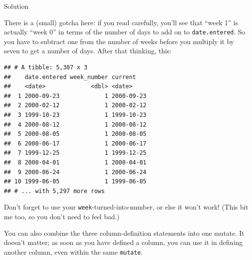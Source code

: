 \documentclass[]{tufte-book}
\newenvironment{Shaded}{}{}
\newcommand{\DataTypeTok}[1]{\textcolor[rgb]{0.56,0.13,0.00}{#1}}
\newcommand{\DecValTok}[1]{\textcolor[rgb]{0.25,0.63,0.44}{#1}}
\newcommand{\KeywordTok}[1]{\textcolor[rgb]{0.00,0.44,0.13}{\textbf{#1}}}
\newcommand{\NormalTok}[1]{#1}
\newcommand{\OperatorTok}[1]{\textcolor[rgb]{0.40,0.40,0.40}{#1}}
\newcommand{\StringTok}[1]{\textcolor[rgb]{0.25,0.44,0.63}{#1}}
\theoremstyle{definition}
\theoremstyle{definition}
\theoremstyle{definition}
\theoremstyle{remark}
\begin{document}
Solution

There is a (small) gotcha here: if you read carefully, you'll see that
``week 1'' is actually ``week 0'' in terms of the number of days to add
on to \texttt{date.entered}. So you have to subtract one from the number
of weeks before you multiply it by seven to get a number of days. After
that thinking, this:

\begin{Shaded}
\end{Shaded}

\begin{verbatim}
## # A tibble: 5,307 x 3
##    date.entered week_number current   
##    <date>             <dbl> <date>    
##  1 2000-09-23             1 2000-09-23
##  2 2000-02-12             1 2000-02-12
##  3 1999-10-23             1 1999-10-23
##  4 2000-08-12             1 2000-08-12
##  5 2000-08-05             1 2000-08-05
##  6 2000-06-17             1 2000-06-17
##  7 1999-12-25             1 1999-12-25
##  8 2000-04-01             1 2000-04-01
##  9 2000-06-24             1 2000-06-24
## 10 1999-06-05             1 1999-06-05
## # ... with 5,297 more rows
\end{verbatim}

Don't forget to use your \texttt{week}-turned-into-number, or else it
won't work! (This bit me too, so you don't need to feel bad.)

You can also combine the three column-definition statements into one
mutate. It doesn't matter; as soon as you have defined a column, you can
use it in defining another column, even within the same \texttt{mutate}.
\end{document}
